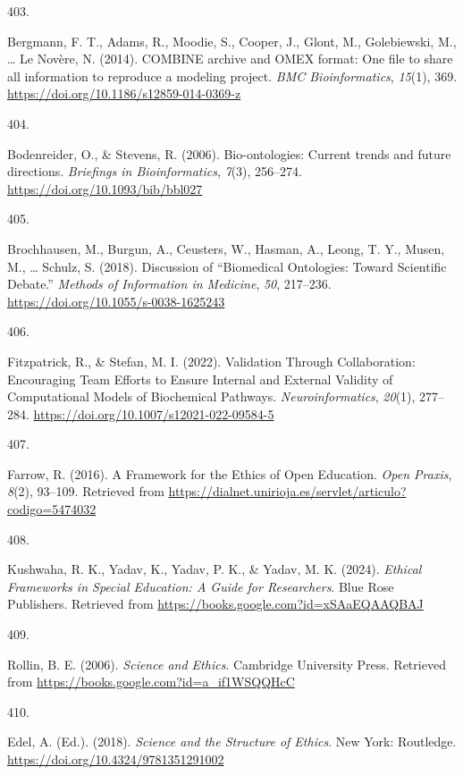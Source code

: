 \documentclass[
  11pt,
  letterpaper,
]{scrreprt}
\newlength{\cslhangindent}
\newlength{\csllabelwidth}
\newenvironment{CSLReferences}[2] %
 {\begin{list}{}{%
  \setlength{\itemindent}{0pt}
  \setlength{\leftmargin}{0pt}
  \setlength{\parsep}{0pt}
  \ifodd #1
   \setlength{\leftmargin}{\cslhangindent}
   \setlength{\itemindent}{-1\cslhangindent}
  \fi
  \setlength{\itemsep}{#2\baselineskip}}}
 {\end{list}}
\newcommand{\CSLLeftMargin}[1]{\parbox[t]{\csllabelwidth}{\strut#1\strut}}
\newcommand{\CSLRightInline}[1]{\parbox[t]{\linewidth - \csllabelwidth}{\strut#1\strut}}
\begin{document}
\begin{CSLReferences}{0}{0}
\CSLLeftMargin{403. }%
\CSLRightInline{Bergmann, F. T., Adams, R., Moodie, S., Cooper, J.,
Glont, M., Golebiewski, M., \ldots{} Le Novère, N. (2014). {COMBINE}
archive and {OMEX} format: One file to share all information to
reproduce a modeling project. \emph{BMC Bioinformatics}, \emph{15}(1),
369. \url{https://doi.org/10.1186/s12859-014-0369-z}}

\CSLLeftMargin{404. }%
\CSLRightInline{Bodenreider, O., \& Stevens, R. (2006). Bio-ontologies:
Current trends and future directions. \emph{Briefings in
Bioinformatics}, \emph{7}(3), 256--274.
\url{https://doi.org/10.1093/bib/bbl027}}

\CSLLeftMargin{405. }%
\CSLRightInline{Brochhausen, M., Burgun, A., Ceusters, W., Hasman, A.,
Leong, T. Y., Musen, M., \ldots{} Schulz, S. (2018). Discussion of
{``{Biomedical Ontologies}: {Toward Scientific Debate}.''} \emph{Methods
of Information in Medicine}, \emph{50}, 217--236.
\url{https://doi.org/10.1055/s-0038-1625243}}

\CSLLeftMargin{406. }%
\CSLRightInline{Fitzpatrick, R., \& Stefan, M. I. (2022). Validation
{Through Collaboration}: {Encouraging Team Efforts} to {Ensure Internal}
and {External Validity} of {Computational Models} of {Biochemical
Pathways}. \emph{Neuroinformatics}, \emph{20}(1), 277--284.
\url{https://doi.org/10.1007/s12021-022-09584-5}}

\CSLLeftMargin{407. }%
\CSLRightInline{Farrow, R. (2016). A {Framework} for the {Ethics} of
{Open Education}. \emph{Open Praxis}, \emph{8}(2), 93--109. Retrieved
from \url{https://dialnet.unirioja.es/servlet/articulo?codigo=5474032}}

\CSLLeftMargin{408. }%
\CSLRightInline{Kushwaha, R. K., Yadav, K., Yadav, P. K., \& Yadav, M.
K. (2024). \emph{Ethical {Frameworks} in {Special Education}: {A Guide}
for {Researchers}}. Blue Rose Publishers. Retrieved from
\url{https://books.google.com?id=xSAaEQAAQBAJ}}

\CSLLeftMargin{409. }%
\CSLRightInline{Rollin, B. E. (2006). \emph{Science and {Ethics}}.
Cambridge University Press. Retrieved from
\url{https://books.google.com?id=a_if1WSQQHcC}}

\CSLLeftMargin{410. }%
\CSLRightInline{Edel, A. (Ed.). (2018). \emph{Science and the
{Structure} of {Ethics}}. New York: Routledge.
\url{https://doi.org/10.4324/9781351291002}}


\end{CSLReferences}
\end{document}
